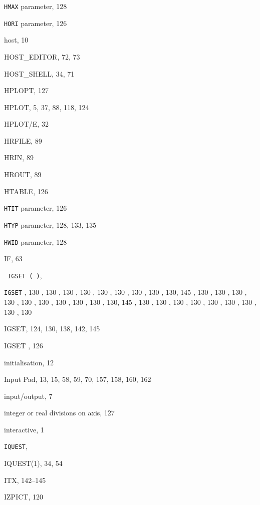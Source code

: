 \begin{theindex}
  \item {\tt HMAX}
     parameter, 128
  \item {\tt HORI}
     parameter, 126
  \item host, 10
  \item {\ttfamily  HOST_EDITOR}, 72, 73
  \item {\ttfamily  HOST_SHELL}, 34, 71
  \item {\ttfamily  HPLOPT}, 127
  \item HPLOT, 5, 37, 88, 118, 124
  \item {\ttfamily  HPLOT/E}, 32
  \item {\ttfamily  HRFILE}, 89
  \item {\ttfamily  HRIN}, 89
  \item {\ttfamily  HROUT}, 89
  \item {\ttfamily  HTABLE}, 126
  \item {\tt HTIT}
     parameter, 126
  \item {\tt HTYP}
     parameter, 128, 133, 135
  \item {\tt HWID}
     parameter, 128

  \indexspace

  \item {\ttfamily  IF}, 63
  \item \texttt  { IGSET{ \textrm {( )}}}, 
  \item {\tt IGSET}
    \subitem {\tt  *}, 130
    , 130
    , 130
    , 130
    , 130
    , 130
    , 130
    , 130
    , 130, 145
    , 130
    , 130
    , 130
    , 130
    , 130
    , 130
    , 130
    , 130
    , 130
    , 130, 145
    , 130
    , 130
    , 130
    , 130
    , 130
    , 130
    , 130
    , 130
    , 130
  \item {\ttfamily  IGSET}, 124, 130, 138, 142, 145
  \item {\ttfamily  IGSET }, 126
  \item initialisation, 12
  \item Input Pad, 13, 15, 58, 59, 70, 157, 158, 160, 162
  \item input/output, 7
  \item integer or real divisions on axis, 127
  \item interactive, 1
  \item \texttt{IQUEST}, 
  \item {\ttfamily  IQUEST(1)}, 34, 54
  \item {\ttfamily  ITX}, 142--145
  \item IZPICT, 120


\end{theindex}
